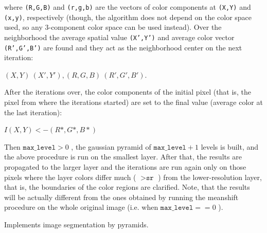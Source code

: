 where \texttt{(R,G,B)} and \texttt{(r,g,b)} are the vectors of color components at \texttt{(X,Y)} and \texttt{(x,y)}, respectively (though, the algorithm does not depend on the color space used, so any 3-component color space can be used instead). Over the neighborhood the average spatial value \texttt{(X',Y')} and average color vector \texttt{(R',G',B')} are found and they act as the neighborhood center on the next iteration: 

$(X,Y)~(X',Y'), (R,G,B)~(R',G',B').$

After the iterations over, the color components of the initial pixel (that is, the pixel from where the iterations started) are set to the final value (average color at the last iteration): 

$I(X,Y) <- (R*,G*,B*)$

Then $\texttt{max\_level}>0$ , the gaussian pyramid of
$\texttt{max\_level}+1$ levels is built, and the above procedure is run
on the smallest layer. After that, the results are propagated to the
larger layer and the iterations are run again only on those pixels where
the layer colors differ much ( $>\texttt{sr}$ ) from the lower-resolution
layer, that is, the boundaries of the color regions are clarified. Note,
that the results will be actually different from the ones obtained by
running the meanshift procedure on the whole original image (i.e. when
$\texttt{max\_level}==0$ ).

Implements image segmentation by pyramids.


\begin{description}
\end{description}

